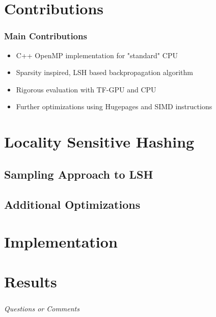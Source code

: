 \documentclass{beamer}
\begin{document}
\section{Contributions}
\begin{frame}
    \frametitle{Main Contributions}

    \begin{itemize}
        \item C++ OpenMP implementation for "standard" CPU
        \item Sparsity inspired, LSH based backpropagation algorithm
        \item Rigorous evaluation with TF-GPU and CPU
        \item Further optimizations using Hugepages and SIMD instructions
    \end{itemize}
    

\end{frame}

\section{Locality Sensitive Hashing}
\subsection{Sampling Approach to LSH}
\subsection{Additional Optimizations}

\section{Implementation}



\section{Results}

\begin{frame}
    \frametitle{}

    \centering \Large
    \emph{Questions or Comments}

\end{frame}



\end{document}
